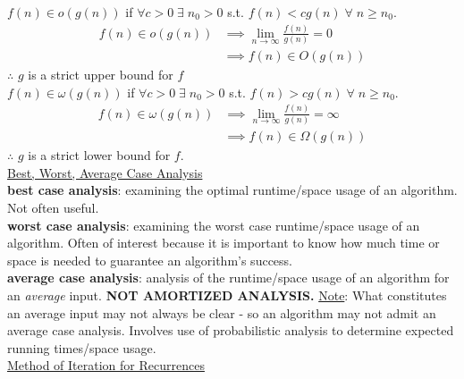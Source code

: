 \documentclass[12pt, fleqn]{general}
\begin{document}
\begin{multicols*}{2}
    $f(n) \in o(g(n))$ if $\forall c > 0\; \exists\; n_0 > 0$ s.t. $f(n) < c g(n)\; \forall\; n \geq n_0$. \vspace{-5pt}
    \begin{align*}
        f(n) \in o(g(n)) &\implies \lim_{n\rightarrow\infty} \frac{f(n)}{g(n)} = 0\\
                         &\implies f(n) \in O(g(n))
    \end{align*}
    $\therefore$ $g$ is a strict upper bound for $f$\\

    $f(n) \in \omega(g(n))$ if $\forall c > 0\; \exists\; n_0 > 0$ s.t. $f(n) > c g(n)\; \forall\; n \geq n_0$.\vspace{-5pt}
    \begin{align*}
        f(n) \in \omega(g(n)) &\implies \lim_{n\rightarrow\infty} \frac{f(n)}{g(n)} = \infty\\
                            &\implies f(n) \in \Omega(g(n))
    \end{align*}
    $\therefore$ $g$ is a strict lower bound for $f$.\\


    {\large \underline{Best, Worst, Average Case Analysis}}\\

    \textbf{best case analysis}: examining the optimal runtime/space usage of an algorithm. Not often useful.\\

    \textbf{worst case analysis}: examining the worst case runtime/space usage of an algorithm. Often of interest because it is important to know how much time or space is needed to guarantee an algorithm's success.\\

    \textbf{average case analysis}: analysis of the runtime/space usage of an algorithm for an \emph{average} input. \textbf{NOT AMORTIZED ANALYSIS.} \underline{Note}: What constitutes an average input may not always be clear - so an algorithm may not admit an average case analysis. Involves use of probabilistic analysis to determine expected running times/space usage.\\

    {\large \underline{Method of Iteration for Recurrences}}\\


\end{multicols*}
\end{document}
